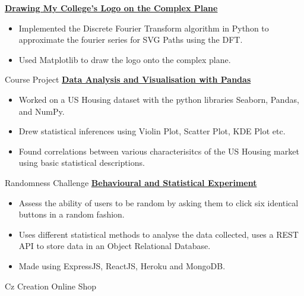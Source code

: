 {}
{\href{https://confumbit.github.io/posts/kmc-logo.html}{\textbf{Drawing My College's Logo on the Complex Plane}}}
{
    \begin{itemize}
        \item Implemented the Discrete Fourier Transform algorithm in Python to approximate the fourier series for SVG Paths using the DFT.
        \item Used Matplotlib to draw the logo onto the complex plane.
    \end{itemize}
}
%
%
{Course Project}
{\href{https://drive.google.com/file/d/1EF9wtUCJqQINYWiY4uFL4mmktJBL6r1b/view?usp=sharing}{\textbf{Data Analysis and Visualisation with Pandas}}}
{
    \begin{itemize}
        \item Worked on a US Housing dataset with the python libraries Seaborn, Pandas, and NumPy.
        \item Drew statistical inferences using Violin Plot, Scatter Plot, KDE Plot etc.
        \item Found correlations between various characterisitcs of the US Housing market using basic statistical descriptions.
    \end{itemize}
}
%
%
%
%
{Randomness Challenge}
{\href{https://randomnesschallenge-71zq.onrender.com/}{\textbf{Behavioural and Statistical Experiment}}}
{
    \begin{itemize}
        \item Assess the ability of users to be random by asking them to click six identical buttons in a random fashion.
        \item Uses different statistical methods to analyse the data collected, uses a REST API to store data in an Object Relational Database.
        \item Made using ExpressJS, ReactJS, Heroku and MongoDB.
    \end{itemize}
}
%
%
{Cz Creation Online Shop}
